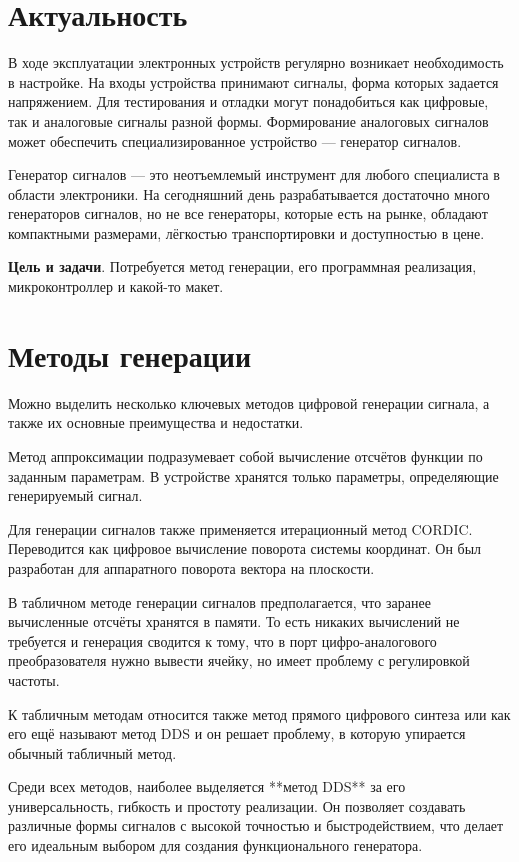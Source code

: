 \documentclass[a4paper, 14pt]{extarticle}
\begin{document}
\section*{Актуальность}
	В ходе эксплуатации электронных устройств регулярно возникает необходимость в настройке. На входы устройства принимают сигналы, форма которых задается напряжением. Для тестирования и отладки могут понадобиться как цифровые, так и аналоговые сигналы разной формы. Формирование аналоговых сигналов может обеспечить специализированное устройство --- генератор сигналов.
	
	Генератор сигналов --- это неотъемлемый инструмент для любого специалиста в области электроники. На сегодняшний день разрабатывается достаточно много генераторов сигналов, но не все генераторы, которые есть на рынке, обладают компактными размерами, лёгкостью транспортировки и доступностью в цене. 
	
	\textbf{Цель и задачи}. Потребуется метод генерации, его программная реализация, микроконтроллер и какой-то макет.

\section*{Методы генерации}
	Можно выделить несколько ключевых методов цифровой генерации сигнала, а также их основные преимущества и недостатки.

	Метод аппроксимации подразумевает собой вычисление отсчётов
функции по заданным параметрам. В устройстве хранятся только параметры, определяющие генерируемый сигнал. 

	Для генерации сигналов также применяется итерационный метод CORDIC. Переводится как цифровое вычисление поворота системы координат. Он был разработан для аппаратного поворота вектора на плоскости. 
	
	В табличном методе генерации сигналов предполагается, что заранее
вычисленные отсчёты хранятся в памяти. То есть никаких вычислений не требуется и генерация сводится к тому, что в порт цифро-аналогового преобразователя нужно вывести ячейку, но имеет проблему с регулировкой частоты.

 	К табличным методам относится также метод прямого цифрового синтеза или как его ещё называют метод DDS и он решает проблему, в которую упирается обычный табличный метод.

	Среди всех методов, наиболее выделяется **метод DDS** за его универсальность,
 гибкость и простоту реализации. Он позволяет создавать различные формы сигналов
 с высокой точностью и быстродействием, что делает его идеальным выбором для создания функционального генератора.
 
\end{document}
